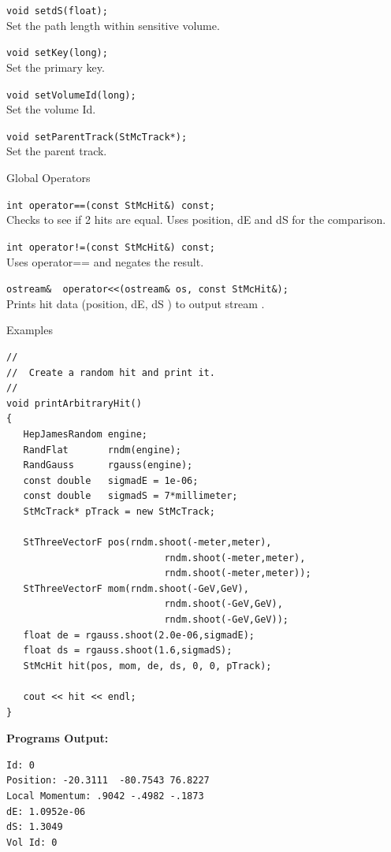 \begin{Entry}
    \verb+void setdS(float);+\\
    Set the path length within sensitive volume.

    \verb+void setKey(long);+\\
    Set the primary key.

    \verb+void setVolumeId(long);+\\
    Set the volume Id.

    \verb+void setParentTrack(StMcTrack*);+\\
    Set the parent track.
    
\item[Global Operators]

    \verb+int operator==(const StMcHit&) const;+\\
    Checks to see if 2 hits are equal.  Uses position, dE and dS
    for the comparison.

    \verb+int operator!=(const StMcHit&) const;+\\
    Uses operator== and negates the result.

    \verb+ostream&  operator<<(ostream& os, const StMcHit&);+\\
    Prints hit data (position, dE, dS ) to output stream .

\item[Examples]
{\footnotesize
\begin{verbatim}
//
//  Create a random hit and print it.
//
void printArbitraryHit()
{
   HepJamesRandom engine;
   RandFlat       rndm(engine);
   RandGauss      rgauss(engine);
   const double   sigmadE = 1e-06;
   const double   sigmadS = 7*millimeter;
   StMcTrack* pTrack = new StMcTrack;

   StThreeVectorF pos(rndm.shoot(-meter,meter),
                            rndm.shoot(-meter,meter),
                            rndm.shoot(-meter,meter));
   StThreeVectorF mom(rndm.shoot(-GeV,GeV),
                            rndm.shoot(-GeV,GeV),
                            rndm.shoot(-GeV,GeV));
   float de = rgauss.shoot(2.0e-06,sigmadE);
   float ds = rgauss.shoot(1.6,sigmadS);
   StMcHit hit(pos, mom, de, ds, 0, 0, pTrack);

   cout << hit << endl;
}
\end{verbatim}
}%
{\bf Programs Output:}
{\footnotesize
\begin{verbatim}
Id: 0
Position: -20.3111  -80.7543 76.8227
Local Momentum: .9042 -.4982 -.1873
dE: 1.0952e-06
dS: 1.3049
Vol Id: 0
\end{verbatim}
}%

\end{Entry}
\clearpage
%
%
